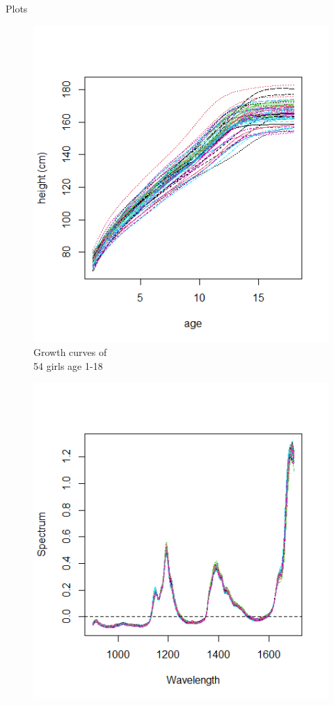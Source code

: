 \documentclass{beamer}
\begin{document}
	\begin{frame}{Plots}
		\begin{minipage}{.5\textwidth}
			\begin{figure}
				
				\includegraphics[width=\textwidth]{../Graphics/Growth_curves.png}
				\caption{Growth curves of \\ 54 girls age 1-18}
			\end{figure}
		\end{minipage}%
		\begin{minipage}{.5\textwidth}
			\begin{figure}
				\includegraphics[width=\textwidth]{../Graphics/NIR.png}

\end{figure}
\end{minipage}
\end{frame}
\end{document}

